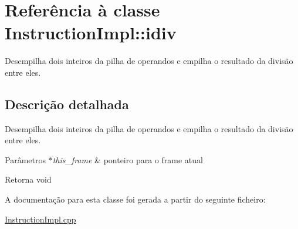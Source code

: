 \hypertarget{class_instruction_impl_1_1idiv}{}\section{Referência à classe Instruction\+Impl\+:\+:idiv}
\label{class_instruction_impl_1_1idiv}


Desempilha dois inteiros da pilha de operandos e empilha o resultado da divisão entre eles.  




\subsection{Descrição detalhada}
Desempilha dois inteiros da pilha de operandos e empilha o resultado da divisão entre eles. 


\begin{DoxyParams}{Parâmetros}
{\em $\ast$this\+\_\+frame} & ponteiro para o frame atual \\
\hline
\end{DoxyParams}
\begin{DoxyReturn}{Retorna}
void 
\end{DoxyReturn}


A documentação para esta classe foi gerada a partir do seguinte ficheiro\+:\begin{DoxyCompactItemize}
\item 
\hyperlink{_instruction_impl_8cpp}{Instruction\+Impl.\+cpp}\end{DoxyCompactItemize}
